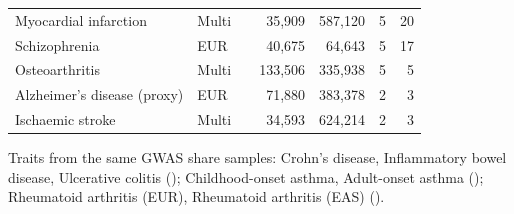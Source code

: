 \begin{table}[tbp]
\begin{tabularx}{\linewidth}{@{}>{\raggedright\arraybackslash}X l l r r r r@{}}
Myocardial infarction & Multi & \cite{sakaue2021} & 35,909 & 587,120 & 5 & 20 \\
Schizophrenia & EUR & \cite{pardinas2018} & 40,675 & 64,643 & 5 & 17 \\
Osteoarthritis & Multi & \cite{mcdonald2022} & 133,506 & 335,938 & 5 & 5 \\
Alzheimer's disease (proxy) & EUR & \cite{jansen2019} & 71,880 & 383,378 & 2 & 3 \\
Ischaemic stroke & Multi & \cite{sakaue2021} & 34,593 & 624,214 & 2 & 3 \\
\bottomrule
\end{tabularx}
\par\smallskip
{\footnotesize\raggedright Traits from the same GWAS share samples: Crohn's disease, Inflammatory bowel disease, Ulcerative colitis (\cite{delange2017}); Childhood-onset asthma, Adult-onset asthma (\cite{ferreira2019}); Rheumatoid arthritis (EUR), Rheumatoid arthritis (EAS) (\cite{ishigaki2022}).\par}
\end{table}
